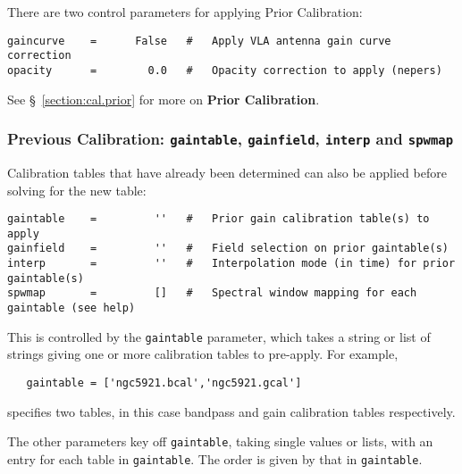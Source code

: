 {There are two control parameters for applying Prior Calibration:
\small
\begin{verbatim}
gaincurve    =      False   #   Apply VLA antenna gain curve correction
opacity      =        0.0   #   Opacity correction to apply (nepers)
\end{verbatim}
\normalsize

See \S~\ref{section:cal.prior} for more on {\bf Prior Calibration}.

\subsubsection{Previous Calibration: {\tt gaintable},
{\tt gainfield}, {\tt interp} and {\tt spwmap} }
\label{section:cal.solve.pars.previous}

Calibration tables that have already been determined can also be
applied before solving for the new table:
\small
\begin{verbatim}
gaintable    =         ''   #   Prior gain calibration table(s) to apply
gainfield    =         ''   #   Field selection on prior gaintable(s)
interp       =         ''   #   Interpolation mode (in time) for prior gaintable(s)
spwmap       =         []   #   Spectral window mapping for each gaintable (see help)
\end{verbatim}
\normalsize

This is controlled by the {\tt gaintable} parameter, which takes 
a string or list of strings giving one or more calibration tables 
to pre-apply.  For example,

\small
\begin{verbatim}
   gaintable = ['ngc5921.bcal','ngc5921.gcal']
\end{verbatim}
\normalsize
specifies two tables, in this case bandpass and gain calibration tables
respectively.

The other parameters key off {\tt gaintable}, taking single values or
lists, with an entry for each table in {\tt gaintable}.  The order is
given by that in {\tt gaintable}.

}
